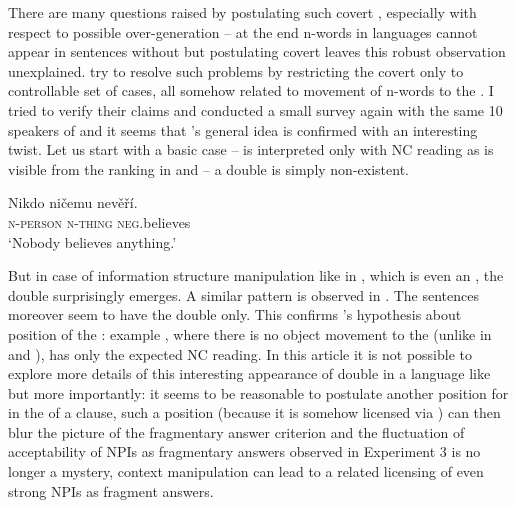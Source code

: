 \documentclass[output=paper, colorlinks, citecolor=brown, newtxmath]{langsci/langscibook}
\begin{document}
\noindent There are many questions raised by postulating such covert , especially with respect to possible over-generation -- at the end n-words in  languages cannot appear in sentences without  but postulating covert  leaves this robust observation unexplained. \cite{fualuaus2016fragment} try to resolve such problems by restricting the covert  only to controllable set of cases, all somehow related to  movement of n-words to the . I tried to verify their claims and conducted a small survey again with the same 10 speakers of  and it seems that \citeauthor{fualuaus2016fragment}'s general idea is confirmed with an interesting twist. Let us start with a basic case --  is interpreted only with NC reading as is visible from the ranking in  and  -- a double  is simply non-existent.

\ea\label{ex-38} \gll Nikdo ničemu nevěří.\\
\textsc{n-person} \textsc{n-thing} \textsc{neg}.believes\\
\glt `Nobody believes anything.'
\z
\z

\noindent But in case of information structure manipulation like in , which is even an , the double  surprisingly emerges. A similar pattern is observed in . The sentences moreover seem to have the double  only. This confirms \citeauthor{fualuaus2016fragment}'s hypothesis about  position of the : example , where there is no object movement to the  (unlike in  and ), has only the expected NC reading. In this article it is not possible to explore more details of this interesting appearance of double  in a  language like  but more importantly: it seems to be reasonable to postulate another position for  in the  of a clause, such a position (because it is somehow licensed via ) can then blur the picture of the fragmentary answer criterion and the fluctuation of acceptability of NPIs as fragmentary answers observed in Experiment 3 is no longer a mystery, context manipulation can lead to a  related  licensing of even strong NPIs as fragment answers.
\end{document}

